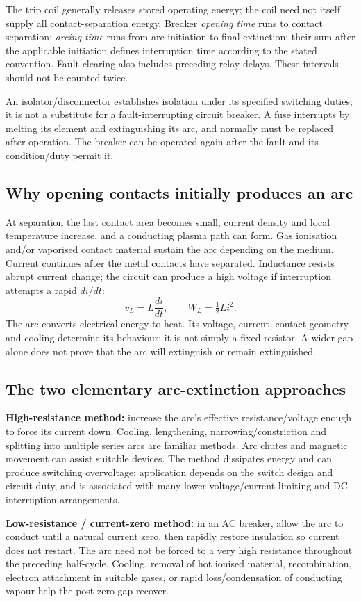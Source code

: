 \documentclass[11pt,a4paper]{article}
\begin{document}
The trip coil generally releases stored operating energy; the coil need not itself supply all contact-separation energy. Breaker \emph{opening time} runs to contact separation; \emph{arcing time} runs from arc initiation to final extinction; their sum after the applicable initiation defines interruption time according to the stated convention. Fault clearing also includes preceding relay delays. These intervals should not be counted twice.

An isolator/disconnector establishes isolation under its specified switching duties; it is not a substitute for a fault-interrupting circuit breaker. A fuse interrupts by melting its element and extinguishing its arc, and normally must be replaced after operation. The breaker can be operated again after the fault and its condition/duty permit it.
\subsection{Why opening contacts initially produces an arc}
At separation the last contact area becomes small, current density and local temperature increase, and a conducting plasma path can form. Gas ionisation and/or vaporised contact material sustain the arc depending on the medium. Current continues after the metal contacts have separated. Inductance resists abrupt current change; the circuit can produce a high voltage if interruption attempts a rapid $di/dt$:
\[
 v_L=L\frac{di}{dt},\qquad W_L=\tfrac12Li^2.
\]
The arc converts electrical energy to heat. Its voltage, current, contact geometry and cooling determine its behaviour; it is not simply a fixed resistor. A wider gap alone does not prove that the arc will extinguish or remain extinguished.
\subsection{The two elementary arc-extinction approaches}
\textbf{High-resistance method:} increase the arc's effective resistance/voltage enough to force its current down. Cooling, lengthening, narrowing/constriction and splitting into multiple series arcs are familiar methods. Arc chutes and magnetic movement can assist suitable devices. The method dissipates energy and can produce switching overvoltage; application depends on the switch design and circuit duty, and is associated with many lower-voltage/current-limiting and DC interruption arrangements.

\textbf{Low-resistance / current-zero method:} in an AC breaker, allow the arc to conduct until a natural current zero, then rapidly restore insulation so current does not restart. The arc need not be forced to a very high resistance throughout the preceding half-cycle. Cooling, removal of hot ionised material, recombination, electron attachment in suitable gases, or rapid loss/condensation of conducting vapour help the post-zero gap recover.
\end{document}
